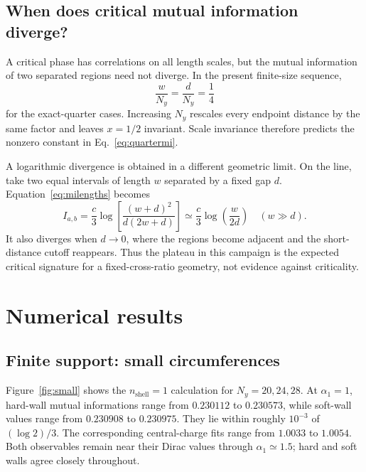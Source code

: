 \documentclass[aps,prb,twocolumn,nofootinbib,superscriptaddress,floatfix]{revtex4-2}
\newcommand{\Iab}{I_{a,b}}
\begin{document}
\subsection{When does critical mutual information diverge?}

A critical phase has correlations on all length scales, but the mutual
information of two separated regions need not diverge.  In the present
finite-size sequence,
\begin{equation}
 \frac{w}{N_y}=\frac{d}{N_y}=\frac14
\end{equation}
for the exact-quarter cases.  Increasing $N_y$ rescales every endpoint
distance by the same factor and leaves $x=1/2$ invariant.  Scale invariance
therefore predicts the nonzero constant in Eq.~\eqref{eq:quartermi}.

A logarithmic divergence is obtained in a different geometric limit.  On the
line, take two equal intervals of length $w$ separated by a fixed gap $d$.
Equation~\eqref{eq:milengths} becomes
\begin{equation}
 \Iab=\frac{c}{3}\log\left[
 \frac{(w+d)^2}{d(2w+d)}\right]
 \simeq\frac{c}{3}\log\left(\frac{w}{2d}\right)
 \quad (w\gg d).
 \label{eq:divergentlimit}
\end{equation}
It also diverges when $d\to0$, where the regions become adjacent and the
short-distance cutoff reappears.  Thus the plateau in this campaign is the
expected critical signature for a fixed-cross-ratio geometry, not evidence
against criticality.

\section{Numerical results}
\label{sec:results}

\subsection{Finite support: small circumferences}

Figure~\ref{fig:small} shows the $n_{\mathrm{shell}}=1$ calculation for
$N_y=20,24,28$.  At $\alpha_1=1$, hard-wall mutual informations range from
$0.230112$ to $0.230573$, while soft-wall values range from $0.230908$ to
$0.230975$.  They lie within roughly $10^{-3}$ of $(\log 2)/3$.  The corresponding
central-charge fits range from $1.0033$ to $1.0054$.  Both observables remain
near their Dirac values through $\alpha_1\simeq1.5$; hard and soft walls agree
closely throughout.
\end{document}
